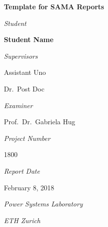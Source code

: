 \documentclass[a4paper,11pt,twoside,onecolumn]{book}
\begin{document}
\frontmatter

\thispagestyle{empty}

\begin{center}

\vspace*{\fill}

\vspace*{\fill}

\textbf{\Huge Template for SAMA Reports}

\vspace*{\fill}

%

\textit{\large Student}

\textbf{\large Student Name}

\vspace{\baselineskip}

%

\textit{\large Supervisors}

{\large Assistant Uno}

{\large Dr.\ Post Doc}

\vspace*{\baselineskip}

%

\textit{\large Examiner}

{\large Prof.\ Dr.\ Gabriela Hug}

\vspace{\baselineskip}

%

\textit{\large Project Number}

{\large 1800}

\vspace{\baselineskip}

%

\textit{\large Report Date}

{\large February 8, 2018}

%

\vspace*{\fill}

\vspace*{\fill}

\textit{\large Power Systems Laboratory}

\vspace{0.5\baselineskip}

\textit{\large ETH Zurich}

\end{center}

\end{document}
